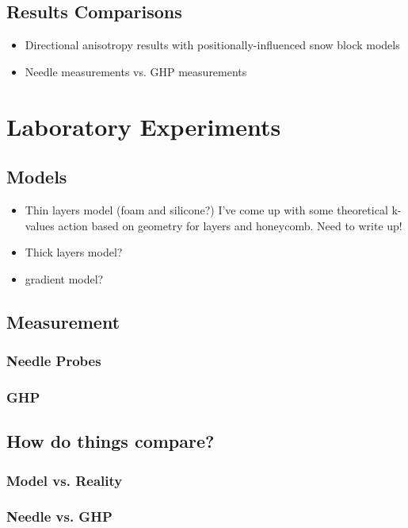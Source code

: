 \documentclass[10pt, letterpaper]{article}
\begin{document}
      \subsection{Results Comparisons}
        \begin{itemize}
          \item Directional anisotropy results with positionally-influenced snow block models
          \item Needle measurements vs. GHP measurements
        \end{itemize}
    \section{Laboratory Experiments}
      \subsection{Models}
        \begin{itemize}
          \item Thin layers model (foam and silicone?)
            I've come up with some theoretical k-values action based on geometry for layers and honeycomb. Need to write up!
          \item Thick layers model?
          \item gradient model?
        \end{itemize}
      \subsection{Measurement}
        \subsubsection{Needle Probes}
        \subsubsection{GHP}
      \subsection{How do things compare?}
        \subsubsection{Model vs. Reality}
        \subsubsection{Needle vs. GHP}
\end{document}
